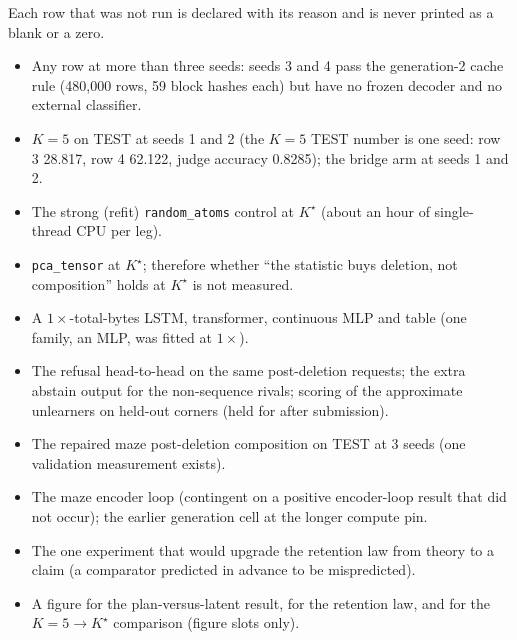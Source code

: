 \documentclass{article} %
\newcommand{\Kstar}{\ensuremath{K^{\star}}}
\begin{document}
Each row that was not run is declared with its reason and is never printed as a blank or a zero.
\begin{itemize}[leftmargin=*,itemsep=1pt]
\item Any row at more than three seeds: seeds 3 and 4 pass the generation-2 cache rule
  (480,000 rows, 59 block hashes each) but have no frozen decoder and no external classifier.
\item $K=5$ on TEST at seeds 1 and 2 (the $K=5$ TEST number is one seed: row 3 28.817, row 4
  62.122, judge accuracy 0.8285); the bridge arm at seeds 1 and 2. %
\item The strong (refit) \texttt{random\_atoms} control at $\Kstar$ (about an hour of
  single-thread CPU per leg). %
\item \texttt{pca\_tensor} at $\Kstar$; therefore whether ``the statistic buys deletion, not
  composition'' holds at $\Kstar$ is not measured.
\item A $1\times$-total-bytes LSTM, transformer, continuous MLP and table (one family, an MLP, was
  fitted at $1\times$).
\item The refusal head-to-head on the same post-deletion requests; the extra abstain output for the
  non-sequence rivals; scoring of the approximate unlearners on held-out corners (held for after
  submission).
\item The repaired maze post-deletion composition on TEST at 3 seeds (one validation measurement
  exists).
\item The maze encoder loop (contingent on a positive encoder-loop result that did not occur); the
  earlier generation cell at the longer compute pin.
\item The one experiment that would upgrade the retention law from theory to a claim (a comparator
  predicted in advance to be mispredicted).
\item A figure for the plan-versus-latent result, for the retention law, and for the $K=5\to\Kstar$
  comparison (figure slots only).
\end{itemize}

\iffalse
\end{document}
